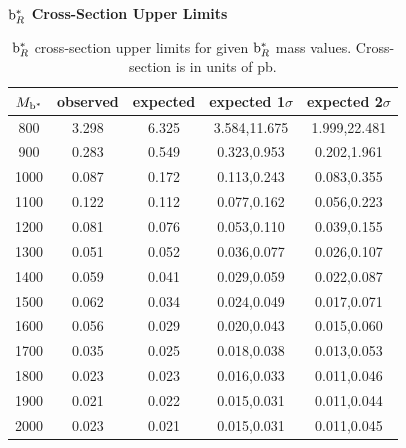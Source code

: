 \begin{table}
\begin{center}
\bf{$\mathrm{b}^{*}_R$ Cross-Section Upper Limits}\\
\begin{tabular}{|c||c|c|c|c|}
\hline
\bf{$M_{\mathrm{b}^{*}}$} & \bf{observed}  & \bf{expected} & \bf{expected 1$\sigma$}  & \bf{expected 2$\sigma$} \\
\hline
\hline
800 & 3.298 & 6.325 & 3.584,11.675 & 1.999,22.481\\ 
\hline
900 & 0.283 & 0.549 & 0.323,0.953 & 0.202,1.961\\ 
\hline
1000 & 0.087 & 0.172 & 0.113,0.243 & 0.083,0.355\\ 
\hline
1100 & 0.122 & 0.112 & 0.077,0.162 & 0.056,0.223\\ 
\hline
1200 & 0.081 & 0.076 & 0.053,0.110 & 0.039,0.155\\ 
\hline
1300 & 0.051 & 0.052 & 0.036,0.077 & 0.026,0.107\\ 
\hline
1400 & 0.059 & 0.041 & 0.029,0.059 & 0.022,0.087\\ 
\hline
1500 & 0.062 & 0.034 & 0.024,0.049 & 0.017,0.071\\ 
\hline
1600 & 0.056 & 0.029 & 0.020,0.043 & 0.015,0.060\\ 
\hline
1700 & 0.035 & 0.025 & 0.018,0.038 & 0.013,0.053\\ 
\hline
1800 & 0.023 & 0.023 & 0.016,0.033 & 0.011,0.046\\ 
\hline
1900 & 0.021 & 0.022 & 0.015,0.031 & 0.011,0.044\\ 
\hline
2000 & 0.023 & 0.021 & 0.015,0.031 & 0.011,0.045\\ 
\hline
\end{tabular}
\end{center}
\caption{$\mathrm{b}^{*}_R$ cross-section upper limits for given $\mathrm{b}^{*}_R$ mass values.  Cross-section is in units of pb.}
\label{table:bsupperxsecR}
\end{table}


